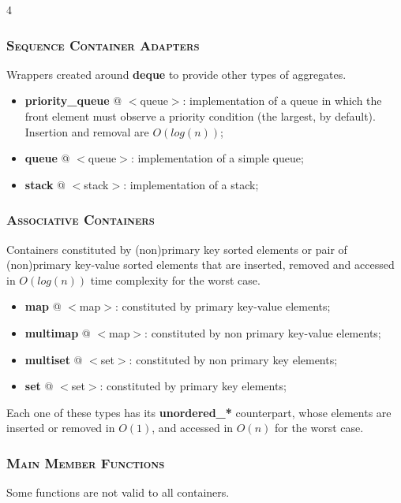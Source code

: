 \documentclass[10pt]{article}
\begin{document}
\begin{multicols*}{4}
{\subsubsection*{\textsc{Sequence Container Adapters}} 
\noindent
Wrappers created around \textbf{deque} to provide other types of aggregates.

\begin{itemize}[leftmargin=*,topsep=0.25pt]
  \setlength\itemsep{-1.8pt}
	\item \textbf{priority\_queue} @ $<$queue$>$: implementation of a queue in which the front element must observe a priority condition (the largest, by default). Insertion and removal are $O(log(n))$;
	\item \textbf{queue} @ $<$queue$>$: implementation of a simple queue;
	\item \textbf{stack} @ $<$stack$>$: implementation of a stack;
\end{itemize}
\noindent

\subsubsection*{\textsc{Associative Containers}} 
\noindent
Containers constituted by (non)primary key sorted elements or pair of (non)primary key-value sorted elements that are  inserted, removed and accessed in $O(log(n))$ time complexity for the worst case.

\begin{itemize}[leftmargin=*,topsep=0.25pt]
  \setlength\itemsep{-1.8pt}
	\item \textbf{map} @ $<$map$>$: constituted by primary key-value elements;
	\item \textbf{multimap} @ $<$map$>$: constituted by non primary key-value elements;  
	\item \textbf{multiset} @ $<$set$>$: constituted by non primary key elements;
	\item \textbf{set} @ $<$set$>$: constituted by primary key elements;
\end{itemize}
\noindent
Each one of these types has its \textbf{unordered\_*} counterpart, whose elements are inserted or removed in $O(1)$, and accessed in $O(n)$ for the worst case. 


\subsubsection*{\textsc{Main Member Functions}} 
\noindent Some functions are not valid to all containers.

}
\end{multicols*}
\end{document}

